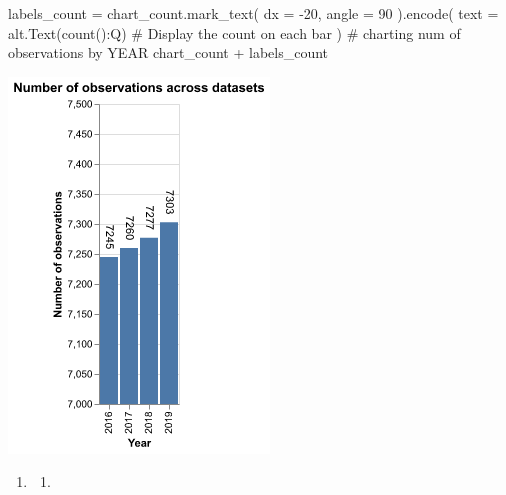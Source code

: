 \documentclass[
  letterpaper,
  DIV=11,
  numbers=noendperiod]{scrartcl}
\newenvironment{Shaded}{\begin{snugshade}}{\end{snugshade}}
\newcommand{\CommentTok}[1]{\textcolor[rgb]{0.37,0.37,0.37}{#1}}
\newcommand{\DecValTok}[1]{\textcolor[rgb]{0.68,0.00,0.00}{#1}}
\newcommand{\NormalTok}[1]{\textcolor[rgb]{0.00,0.23,0.31}{#1}}
\newcommand{\OperatorTok}[1]{\textcolor[rgb]{0.37,0.37,0.37}{#1}}
\newcommand{\StringTok}[1]{\textcolor[rgb]{0.13,0.47,0.30}{#1}}
\providecommand{\tightlist}{%
  \setlength{\itemsep}{0pt}\setlength{\parskip}{0pt}}\usepackage{longtable,booktabs,array}
\begin{document}
\begin{Shaded}
\begin{Highlighting}[]
\NormalTok{labels\_count }\OperatorTok{=}\NormalTok{ chart\_count.mark\_text(}
\NormalTok{    dx }\OperatorTok{=} \OperatorTok{{-}}\DecValTok{20}\NormalTok{,}
\NormalTok{    angle }\OperatorTok{=} \DecValTok{90}
\NormalTok{).encode(}
\NormalTok{    text }\OperatorTok{=}\NormalTok{ alt.Text(}\StringTok{\textquotesingle{}count():Q\textquotesingle{}}\NormalTok{)  }\CommentTok{\# Display the count on each bar}
\NormalTok{)  }\CommentTok{\# charting num of observations by YEAR}
\NormalTok{chart\_count }\OperatorTok{+}\NormalTok{ labels\_count}
\end{Highlighting}
\end{Shaded}

\includegraphics[width=2.72917in,height=3.92708in]{pset4_template_files/figure-pdf/cell-4-output-1.png}

\begin{enumerate}
\def\labelenumi{\arabic{enumi}.}
\setcounter{enumi}{3}
\tightlist
\item
  \begin{enumerate}
  \def\labelenumii{\alph{enumii}.}
  \tightlist
  \item
  \end{enumerate}
\end{enumerate}
\end{document}
